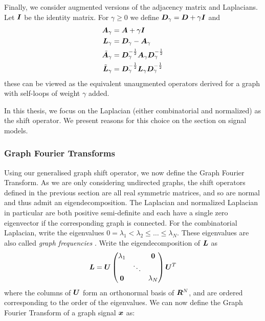 Finally,  we consider augmented versions of the adjacency matrix and Laplacians. Let $\bm{I}$ be the identity matrix. For $\gamma \geq 0$ we define $\bm{D}_{\gamma} =\bm{D} + \gamma\bm{I} $ and
\begin{align}
    \bm{A}_{\gamma} &= \bm{A} + \gamma\bm{I} \\ 
    \bm{L}_{\gamma} &= \bm{D}_{\gamma} - \bm{A}_{\gamma} \\
    \tilde{\bm{A}}_{\gamma} &=\bm{D}_{\gamma}^{-\frac{1}{2}}  \bm{A}_{\gamma} \bm{D}_{\gamma}^{-\frac{1}{2}}\\
    \tilde{\bm{L}}_{\gamma} &=\bm{D}_{\gamma}^{-\frac{1}{2}}  \bm{L}_{\gamma} \bm{D}_{\gamma}^{-\frac{1}{2}}
\end{align}
these can be viewed as the equivalent unaugmented operators derived for a graph with self-loops of weight $\gamma$ added.

In this thesis, we focus on the Laplacian (either combinatorial and normalized) as the shift operator. We present reasons for this choice on the section on signal models.

\subsubsection{Graph Fourier Transforms}
Using our generalised graph shift operator, we now define the Graph Fourier Transform. As we are only considering undirected graphs, the shift operators defined in the previous section are all real symmetric matrices, and so are normal and thus admit an eigendecomposition. The Laplacian and normalized Laplacian in particular are both positive semi-definite and each have a single zero eigenvector if the corresponding graph is connected. For the combinatorial Laplacian, write the eigenvalues $0=\lambda_{1} < \lambda_{2} \leq \ldots \leq \lambda_{N}$. These eigenvalues are also called \emph{graph frequencies} \cite{ortega2018graph}. Write the eigendecomposition of $\bm{L}$ as 
\begin{equation}
    \bm{L} = \bm{U} \begin{pmatrix}
        \lambda_{1} & & \bm{0} \\
        & \ddots & \\
        \bm{0} & & \lambda_{N}
    \end{pmatrix}\bm{U}^{T}
\end{equation}
where the columns of $\bm{U}$ form an orthonormal basis of $\bm{R}^{N}$, and are ordered corresponding to the order of the eigenvalues. 
We can now define the Graph Fourier Transform of a graph signal $\bm{x}$ as:

